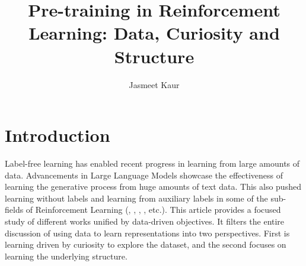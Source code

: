 \documentclass{article}
\title{Pre-training in Reinforcement Learning: Data, Curiosity and Structure}
\author{ Jasmeet Kaur \\ 
}
\date{}
\begin{document}
\maketitle





\section{Introduction}

Label-free learning has enabled recent progress in learning from large amounts of data. Advancements in Large Language Models showcase the effectiveness of learning the generative process from huge amounts of text data. This also pushed learning without labels and learning from auxiliary labels in some of the sub-fields of Reinforcement Learning (\cite{park2024foundation}, \cite{rudolph2024learning}, \cite{li2023accelerating}, \cite{ma2022vip}, etc.). This article provides a focused study of different works unified by data-driven objectives. It filters the entire discussion of using data to learn representations into two perspectives. First is learning driven by curiosity to explore the dataset, and the second focuses on learning the underlying structure. 
\end{document}
